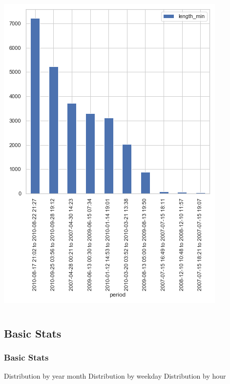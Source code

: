 \documentclass[10pt]{beamer}
\begin{document}
\begin{frame}
\begin{columns}[c]
\bigskip
{
    \centering
    \includegraphics[width=\textwidth,height=\textheight,keepaspectratio]{missing_periods.png}
    \par
}
\bigskip

\end{columns}


\end{frame}

\subsection{Basic Stats}

\begin{frame}
\frametitle{Basic Stats}

Distribution by year month
Distribution by weekday
Distribution by hour

\end{frame}
\end{document}
